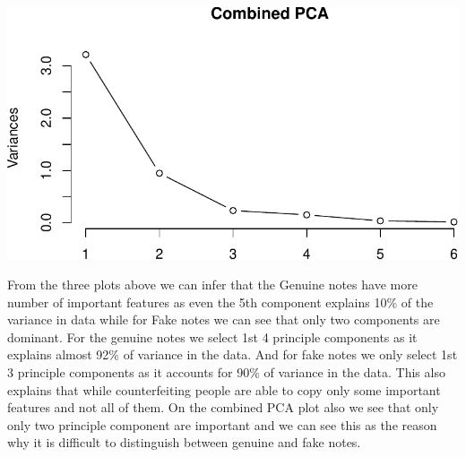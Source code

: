 \documentclass[]{article}
\begin{document}
\begin{center}\includegraphics{HW5_Solution_files/figure-latex/unnamed-chunk-5-3} \end{center}

From the three plots above we can infer that the Genuine notes have more
number of important features as even the 5th component explains 10\% of
the variance in data while for Fake notes we can see that only two
components are dominant. For the genuine notes we select 1st 4 principle
components as it explains almost 92\% of variance in the data. And for
fake notes we only select 1st 3 principle components as it accounts for
90\% of variance in the data. This also explains that while
counterfeiting people are able to copy only some important features and
not all of them. On the combined PCA plot also we see that only only two
principle component are important and we can see this as the reason why
it is difficult to distinguish between genuine and fake notes.
\end{document}
